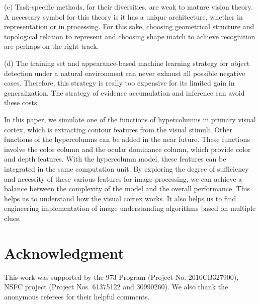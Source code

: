 \documentclass[journal]{IEEEtran}
\begin{document}
(c) Task-specific methods, for their diversities, are weak to mature vision theory. 
A necessary symbol for this theory is it has a unique architecture, whether in representation or in processing. 
For this sake, choosing geometrical structure and topological relation to represent and choosing shape match to achieve recognition are perhaps on the right track.

(d) The training set and appearance-based machine learning strategy for object detection under a natural environment can never exhaust all possible negative cases. Therefore, this strategy is really too expensive for its limited gain in generalization. The strategy of evidence accumulation and inference can avoid these costs.

In this paper, we simulate one of the functions of hypercolumns in primary visual cortex,
which is extracting contour features from the visual stimuli.
Other functions of the hypercolumns can be added in the near future.
These functions involve the color column and the ocular dominance column, which provide color and depth features.
With the hypercolumn model, these features can be integrated in the same computation unit.
By exploring the degree of sufficiency and necessity of these various features for image processing, 
we can achieve a balance between the complexity of the model and the overall performance. 
This helps us to understand how the visual cortex works.
It also helps us to find engineering implementation of image understanding algorithms based on multiple clues.


\section*{Acknowledgment}

This work was supported by the 973 Program (Project No. 2010CB327900), NSFC project (Project Nos. 61375122 and 30990260). We also thank the anonymous referees for their helpful comments.


\ifCLASSOPTIONcaptionsoff
  \newpage
\fi



\end{document}
